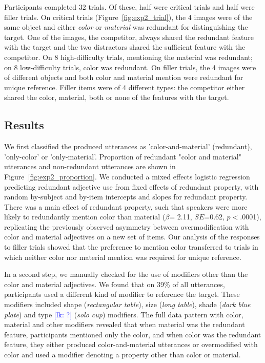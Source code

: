 \documentclass[12pt,letterpaper]{article}
\newcommand{\lk}[1]{\textcolor{Blue}{[lk: #1]}}
\begin{document}
Participants completed 32 trials. Of these, half were critical trials and half were filler trials. On critical trials (Figure~\ref{fig:exp2_trial}), the 4 images were of the same object and either \textit{color} or \textit{material} was redundant for distinguishing the target. One of the images, the competitor, always shared the redundant feature with the target and the two distractors shared the sufficient feature with the competitor. On 8 high-difficulty trials, mentioning the material was redundant; on 8 low-difficulty trials, color was redundant. On filler trials, the 4 images were of different objects and both color and material mention were redundant for unique reference. Filler items were of 4 different types: the competitor either shared the color, material, both or none of the features with the target. 

\subsection{Results}

We first classified the produced utterances as 'color-and-material' (redundant), 'only-color' or 'only-material'. Proportion of redundant "color and material" utterances and non-redundant utterances are shown in Figure~\ref{fig:exp2_proportion}. We conducted a mixed effects logistic regression predicting redundant adjective use from fixed effects of redundant property, with random by-subject and by-item intercepts and slopes for redundant property. There was a main effect of redundant property, such that speakers were more likely to redundantly mention color than material ($\beta$= 2.11, $SE$=0.62, $p$$<$.0001), replicating the previously observed asymmetry between overmodification with color and material adjectives on a new set of items. Our analysis of the responses to filler trials showed that the preference to mention color transferred to trials in which neither color nor material mention was required for unique reference. 

In a second step, we manually checked for the use of modifiers other than the color and material adjectives. We found that on 39\% of all utterances, participants used a different kind of modifier to reference the target. These modifiers included shape (\textit{rectangular table}), size (\textit{long table}), shade (\textit{dark blue plate}) and type \lk{?} (\textit{solo cup}) modifiers. The full data pattern with color, material and other modifiers revealed that when material was the redundant feature, participants mentioned only the color, and when color was the redundant feature, they either produced color-and-material utterances or overmodified with color and used a modifier denoting a property other than color or material. 
\end{document}
